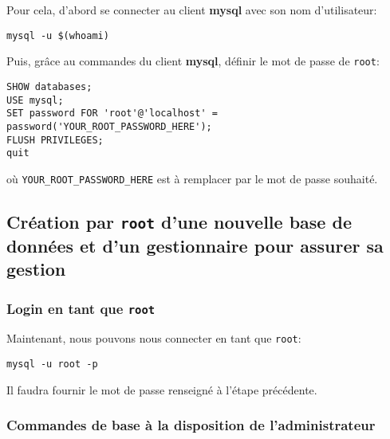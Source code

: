 \documentclass[11pt]{article}
\begin{document}
\begin{enumerate}
Pour cela, d'abord se connecter au client \textbf{mysql}  avec son nom d'utilisateur:

\begin{verbatim}
mysql -u $(whoami)
\end{verbatim}

Puis, grâce au commandes du client \textbf{mysql}, définir le mot de passe de \texttt{root}:

\begin{verbatim}
SHOW databases;
USE mysql;
SET password FOR 'root'@'localhost' = 
password('YOUR_ROOT_PASSWORD_HERE');
FLUSH PRIVILEGES;
quit
\end{verbatim}

où \texttt{YOUR\_ROOT\_PASSWORD\_HERE} est à remplacer par le mot de passe souhaité.
\end{enumerate}

\subsection{Création par \texttt{root} d'une nouvelle base de données et d'un gestionnaire pour assurer sa gestion}
\label{sec:orgf7231b2}

\subsubsection{Login en tant que \texttt{root}}
\label{sec:org77d83de}

Maintenant, nous pouvons nous connecter en tant que \texttt{root}:

\begin{verbatim}
mysql -u root -p
\end{verbatim}

Il faudra fournir le mot de passe renseigné à l'étape précédente.

\subsubsection{Commandes de base à la disposition de l'administrateur}
\label{sec:orgeed9823}
\end{document}
